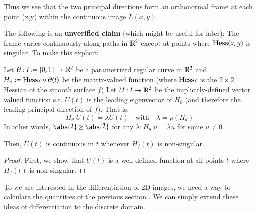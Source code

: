       Thus we see that the two principal directions form an orthonormal frame at each point (x,y) within the continuous image $L(x,y)$.
      
      The following is an \textbf{unverified claim} (which might be useful for later):
      The frame varies continuously along paths in $\mathbb{R}^2$
      except at points where $\mathrm{Hess}(x,y)$ is singular.
      To make this explicit:
      
      \begin{theorem}
      	Let $\theta: I:= [0,1] \to \mathbb{R}^2$ be a parametrized regular curve in $\mathbb{R}^2$ and
      	$H_\theta := \mathrm{Hess}_f  \circ \theta(t)$ be the matrix-valued function
      	(where $\mathrm{Hess}_f$ is the $2\times 2$ Hessian of the smooth surface $f$)
      	Let $U:I \to \mathbb{R}^2$ be the implicitly-defined vector valued function s.t.
      	$U(t)$ is the leading eigenvector of $H_\theta$
      	(and therefore the leading principal direction of $f$). That is,
      	\begin{equation}
      	H_\theta \; U(t) = \lambda U(t) \quad \textrm{with}\quad \lambda = \rho(H_\theta)
      	\end{equation}
      	In other words, $\abs{\lambda} \ge \abs{\tilde{\lambda}}$ for any
      	$\tilde{\lambda} : H_\theta \; u = \tilde{\lambda} u$ for some $u \ne 0$.
      	
      	Then, $U(t)$ is continuous in $t$ whenever $H_f(t)$ is non-singular.
      \end{theorem}
      \begin{proof}
      	First, we show that $U(t)$ is a well-defined function at all points $t$ where
      	$H_f(t)$ is non-singular.
      \end{proof}
      
       To we are interested in the differentiation of 2D images, we need a way
      to calculate the quantities of the previous section . We can simply extend these ideas of differentiation to the discrete domain.
    
